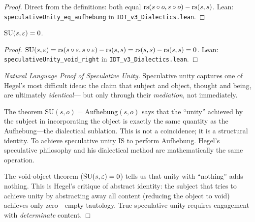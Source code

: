 \begin{proof}
Direct from the definitions: both equal $\mathrm{rs}(s \circ o, s \circ o) - \mathrm{rs}(s, s)$.
Lean: \texttt{speculativeUnity\_eq\_aufhebung} in
\texttt{IDT\_v3\_Dialectics.lean}.
\end{proof}

\begin{theorem}
\label{thm:speculative-void-right}
$\mathrm{SU}(s, \varepsilon) = 0$.
\end{theorem}

\begin{proof}
$\mathrm{SU}(s, \varepsilon) = \mathrm{rs}(s \circ \varepsilon, s \circ \varepsilon) - \mathrm{rs}(s, s)
= \mathrm{rs}(s, s) - \mathrm{rs}(s, s) = 0$.
Lean: \texttt{speculativeUnity\_void\_right} in
\texttt{IDT\_v3\_Dialectics.lean}.
\end{proof}

\begin{proof}[Natural Language Proof of Speculative Unity]
Speculative unity captures one of Hegel's most difficult ideas: the claim
that subject and object, thought and being, are ultimately \emph{identical}---
but only through their \emph{mediation}, not immediately.

The theorem $\mathrm{SU}(s, o) = \mathrm{Aufhebung}(s, o)$ says that the
``unity'' achieved by the subject in incorporating the object is exactly the
same quantity as the Aufhebung---the dialectical sublation. This is not a
coincidence; it is a structural identity. To achieve speculative unity IS to
perform Aufhebung. Hegel's speculative philosophy and his dialectical method
are mathematically the same operation.

The void-object theorem ($\mathrm{SU}(s, \varepsilon) = 0$) tells us that unity
with ``nothing'' adds nothing. This is Hegel's critique of abstract
identity: the subject that tries to achieve unity by abstracting away all
content (reducing the object to void) achieves only zero---empty tautology.
True speculative unity requires engagement with \emph{determinate} content.
\end{proof}

